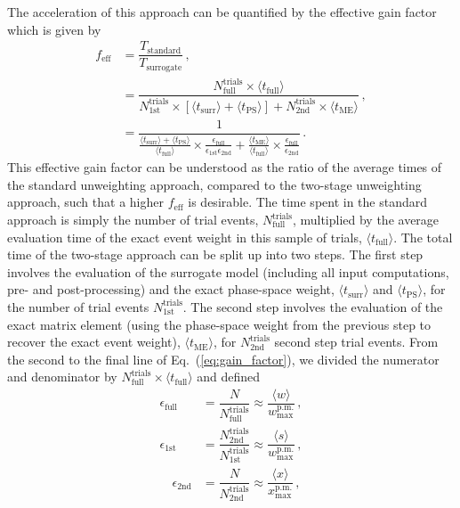 \documentclass[main.tex]{subfiles}
\begin{document}
The acceleration of this approach can be quantified by the
effective gain factor which is given by
\begin{align}\label{eq:gain_factor}
	f_{\text{eff}} & = \dfrac{T_{\text{standard}}}{T_{\text{surrogate}}} \nonumber \, ,\\
	&= \dfrac{N_{\text{full}}^{\text{trials}} \times \langle t_{\text{full}}
	\rangle}{N_{\text{1st}}^{\text{trials}} \times \left[\langle
			t_{\text{surr}} \rangle + \langle t_{\text{PS}}
		\rangle\right] + N_{\text{2nd}}^{\text{trials}} \times \langle
	t_{\text{ME}} \rangle} \, , \\
	&= \dfrac{1}{\frac{\langle t_{\text{surr}} \rangle + \langle
			t_{\text{PS}} \rangle}{\langle t_{\text{full}} \rangle}
			\times
			\frac{\epsilon_{\text{full}}}{\epsilon_{\text{1st}}
			\epsilon_{\text{2nd}}} + \frac{\langle
		t_{\text{ME}} \rangle}{\langle t_{\text{full}} \rangle} \times
	\frac{\epsilon_{\text{full}}}{\epsilon_{\text{2nd}}}} \nonumber \, .
\end{align}
This effective gain factor can be understood as the ratio of the
average times of the standard unweighting approach, compared to the two-stage
unweighting approach, such that a higher $f_{\mathrm{eff}}$ is desirable.
The time spent in the standard approach is simply the number of trial events,
$N_{\mathrm{full}}^{\mathrm{trials}}$, multiplied by the average evaluation
time of the exact event weight in this sample of trials, $\langle t_{\mathrm{full}} \rangle$.
The total time of the two-stage approach can be split up into two steps.
The first step involves the evaluation of the surrogate model
(including all input computations, pre- and post-processing) and the exact phase-space
weight, $\langle t_{\mathrm{surr}} \rangle$ and $\langle t_{\mathrm{PS}} \rangle$,
for the number of trial events $N_{\mathrm{1st}}^{\mathrm{trials}}$. The second
step involves the evaluation of the exact matrix element (using the phase-space weight
from the previous step to recover the exact event weight), $\langle t_{\mathrm{ME}} \rangle$,
for $N_{\mathrm{2nd}}^{\mathrm{trials}}$ second step trial events.
From the second to the final line of Eq.~(\ref{eq:gain_factor}), we divided the numerator and denominator by
$N_{\mathrm{full}}^{\mathrm{trials}} \times \langle t_{\mathrm{full}} \rangle$
and defined
\begin{align}
    \label{eq:unweighting_efficiencies}
    \epsilon_\text{full} &= \dfrac{N}{N^\text{trials}_\text{full}} \approx \dfrac{\langle w \rangle}{w_{\mathrm{max}}^{\mathrm{p.m.}}} \, , \nonumber \\
    \epsilon_\text{1st} &= \dfrac{N^\text{trials}_\text{2nd}}{N^\text{trials}_\text{1st}} \approx \dfrac{\langle s \rangle}{w_{\mathrm{max}}^{\mathrm{p.m.}}} \, , \\
    \quad \epsilon_\text{2nd} &= \dfrac{N}{N^\text{trials}_\text{2nd}} \approx \dfrac{\langle x \rangle}{x_{\mathrm{max}}^{\mathrm{p.m.}}} \, , \nonumber
\end{align}
\end{document}

